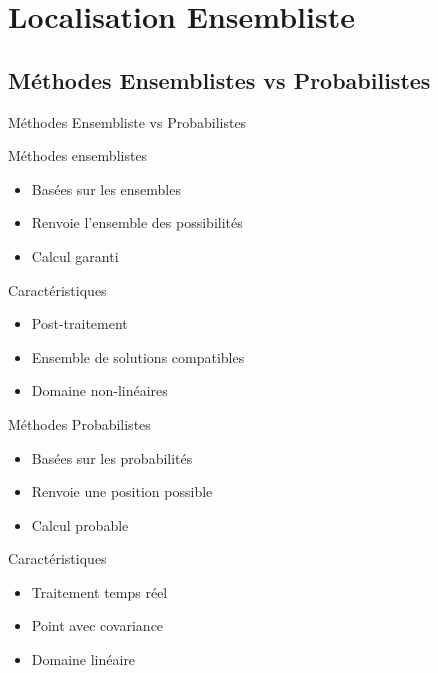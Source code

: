 \documentclass[9pt, xcolor={usenames, dvipsnames}]{beamer}
\begin{document}
		\section{Localisation Ensembliste}

			\subsection{Méthodes Ensemblistes vs Probabilistes}

				\begin{frame}{Méthodes Ensembliste vs Probabilistes}
					\begin{minipage}[t]{0.45\textwidth}
						\begin{block}{Méthodes ensemblistes}
							\begin{itemize}
								\item Basées sur les ensembles
								\item Renvoie l'ensemble des possibilités
								\item Calcul garanti
							\end{itemize}
						\end{block}
						\begin{exampleblock}{Caractéristiques}
							\begin{itemize}
								\item Post-traitement
								\item Ensemble de solutions compatibles
								\item Domaine non-linéaires
							\end{itemize}
						\end{exampleblock}
					\end{minipage}
					\hfill
					\begin{minipage}[t]{0.45\textwidth}
						\begin{block}{Méthodes Probabilistes}
							\begin{itemize}
								\item Basées sur les probabilités
								\item Renvoie une position possible
								\item Calcul probable
							\end{itemize}
						\end{block}
						\begin{exampleblock}{Caractéristiques}
							\begin{itemize}
								\item Traitement temps réel
								\item Point avec covariance
								\item Domaine linéaire
							\end{itemize}
						\end{exampleblock}
					\end{minipage}
				\end{frame}
\end{document}
